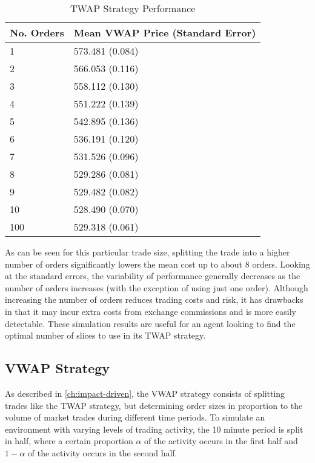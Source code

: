 \begin{table}[htbp]
\begin{center}
\caption{TWAP Strategy Performance} \label{tab:twap_strategy}
\begin{tabular}{l|l}
\hline \hline
\textbf{No. Orders} & \textbf{Mean VWAP Price (Standard Error)} \\
\hline
1                & 573.481 (0.084)            \\
2                & 566.053 (0.116)            \\
3                & 558.112 (0.130)            \\
4                & 551.222 (0.139)            \\
5                & 542.895 (0.136)            \\
6                & 536.191 (0.120)            \\
7                & 531.526 (0.096)            \\
8                & 529.286 (0.081)            \\
9                & 529.482 (0.082)            \\
10               & 528.490 (0.070)            \\
100              & 529.318 (0.061)           
\end{tabular}
\end{center}
\end{table}

As can be seen for this particular trade size, splitting the trade into a higher number of orders significantly lowers the mean cost up to about 8 orders. Looking at the standard errors, the variability of performance generally decreases as the number of orders increases (with the exception of using just one order). Although increasing the number of orders reduces trading costs and risk, it has drawbacks in that it may incur extra costs from exchange commissions and is more easily detectable. These simulation results are useful for an agent looking to find the optimal number of slices to use in its TWAP strategy. 

\subsection{VWAP Strategy}
As described in \ref{ch:impact-driven}, the VWAP strategy consists of splitting trades like the TWAP strategy, but determining order sizes in proportion to the volume of market trades during different time periods. To simulate an environment with varying levels of trading activity, the 10 minute period is split in half, where a certain proportion $\alpha$ of the activity occurs in the first half and $1-\alpha$ of the activity occurs in the second half. 

